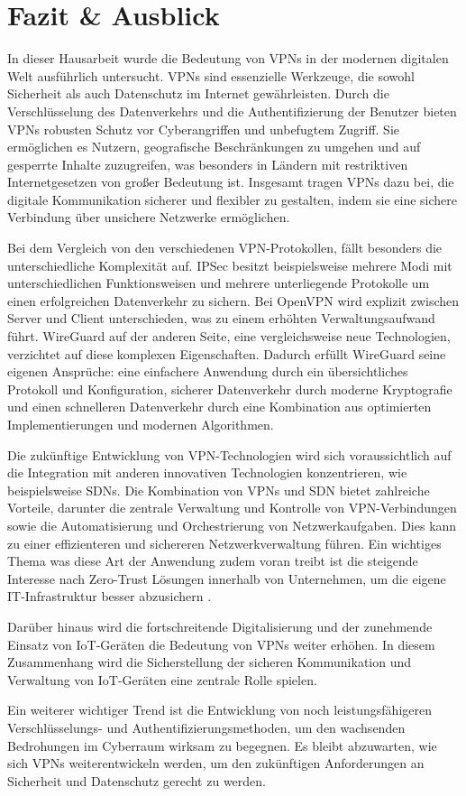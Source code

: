 \chapter{Fazit \& Ausblick} \label{fazit}

In dieser Hausarbeit wurde die Bedeutung von \gls{VPN}s in der modernen digitalen Welt ausführlich untersucht. \gls{VPN}s sind essenzielle Werkzeuge, die sowohl Sicherheit als auch Datenschutz im Internet gewährleisten. Durch die Verschlüsselung des Datenverkehrs und die Authentifizierung der Benutzer bieten \gls{VPN}s robusten Schutz vor Cyberangriffen und unbefugtem Zugriff. Sie ermöglichen es Nutzern, geografische Beschränkungen zu umgehen und auf gesperrte Inhalte zuzugreifen, was besonders in Ländern mit restriktiven Internetgesetzen von großer Bedeutung ist. Insgesamt tragen \gls{VPN}s dazu bei, die digitale Kommunikation sicherer und flexibler zu gestalten, indem sie eine sichere Verbindung über unsichere Netzwerke ermöglichen.

Bei dem Vergleich von den verschiedenen \gls{VPN}-Protokollen, fällt besonders die unterschiedliche Komplexität auf. \gls{IPSec} besitzt beispielsweise mehrere Modi mit unterschiedlichen Funktionsweisen und mehrere unterliegende Protokolle um einen erfolgreichen Datenverkehr zu sichern. Bei OpenVPN wird explizit zwischen Server und Client unterschieden, was zu einem erhöhten Verwaltungsaufwand führt. WireGuard auf der anderen Seite, eine vergleichsweise neue Technologien, verzichtet auf diese komplexen Eigenschaften. Dadurch erfüllt WireGuard seine eigenen Ansprüche: eine einfachere Anwendung durch ein übersichtliches Protokoll und Konfiguration, sicherer Datenverkehr durch moderne Kryptografie und einen schnelleren Datenverkehr durch eine Kombination aus optimierten Implementierungen und modernen Algorithmen.

Die zukünftige Entwicklung von \gls{VPN}-Technologien wird sich voraussichtlich auf die Integration mit anderen innovativen Technologien konzentrieren, wie beispielsweise \gls{SDN}s. Die Kombination von \gls{VPN}s und \gls{SDN} bietet zahlreiche Vorteile, darunter die zentrale Verwaltung und Kontrolle von \gls{VPN}-Verbindungen sowie die Automatisierung und Orchestrierung von Netzwerkaufgaben. Dies kann zu einer effizienteren und sichereren Netzwerkverwaltung führen. Ein wichtiges Thema was diese Art der Anwendung zudem voran treibt ist die steigende Interesse nach Zero-Trust Lösungen innerhalb von Unternehmen, um die eigene IT-Infrastruktur besser abzusichern \cite{Statista_ZeroTrust}. 

Darüber hinaus wird die fortschreitende Digitalisierung und der zunehmende Einsatz von \gls{IoT}-Geräten die Bedeutung von \gls{VPN}s weiter erhöhen. In diesem Zusammenhang wird die Sicherstellung der sicheren Kommunikation und Verwaltung von \gls{IoT}-Geräten eine zentrale Rolle spielen.

Ein weiterer wichtiger Trend ist die Entwicklung von noch leistungsfähigeren Verschlüsselungs- und Authentifizierungsmethoden, um den wachsenden Bedrohungen im Cyberraum wirksam zu begegnen. Es bleibt abzuwarten, wie sich \gls{VPN}s weiterentwickeln werden, um den zukünftigen Anforderungen an Sicherheit und Datenschutz gerecht zu werden.